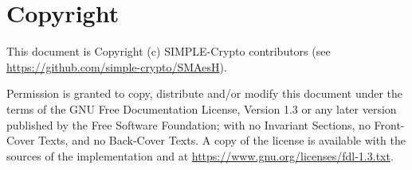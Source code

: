 \documentclass{scrartcl}
\begin{document}
\section{Copyright}

This document is Copyright (c) SIMPLE-Crypto contributors (see \url{https://github.com/simple-crypto/SMAesH}).

Permission is granted to copy, distribute and/or modify this document under the
terms of the GNU Free Documentation License, Version 1.3 or any later version
published by the Free Software Foundation; with no Invariant Sections, no
Front-Cover Texts, and no Back-Cover Texts.
A copy of the license is available with the sources of the implementation and
at \url{https://www.gnu.org/licenses/fdl-1.3.txt}.



\end{document}
